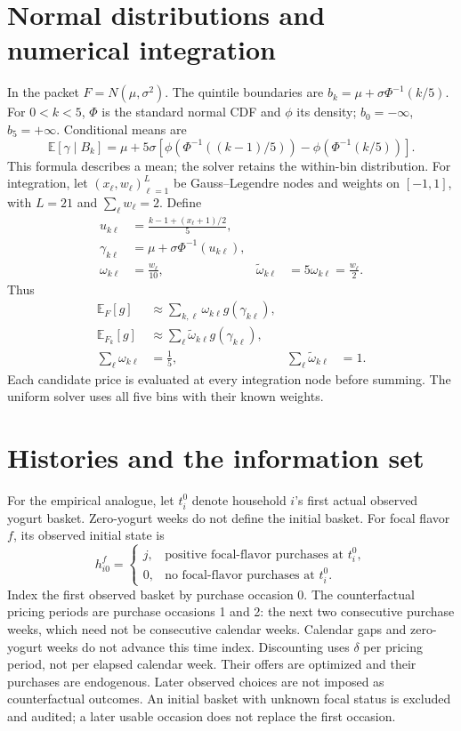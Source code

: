\documentclass[11pt]{article}
\newcommand{\E}{\mathbb{E}}
\begin{document}
\section{Normal distributions and numerical integration}
In the packet $F=N(\mu,\sigma^2)$. The quintile boundaries are
$b_k=\mu+\sigma\Phi^{-1}(k/5)$.
For $0<k<5$, $\Phi$ is the standard normal CDF and $\phi$ its density;
$b_0=-\infty$, $b_5=+\infty$. Conditional means are
\begin{equation}
 \E[\gamma\mid B_k]=\mu+5\sigma\left[
 \phi(\Phi^{-1}((k-1)/5))-\phi(\Phi^{-1}(k/5))\right].
\end{equation}
This formula describes a mean; the solver retains the within-bin distribution.
For integration, let $(x_\ell,w_\ell)_{\ell=1}^L$ be Gauss--Legendre nodes
and weights on $[-1,1]$, with $L=21$ and $\sum_\ell w_\ell=2$. Define
\begin{align}
 u_{k\ell}&=\frac{k-1+(x_\ell+1)/2}{5},\\
 \gamma_{k\ell}&=\mu+\sigma\Phi^{-1}(u_{k\ell}),\\
 \omega_{k\ell}&=\frac{w_\ell}{10},&
 \widetilde\omega_{k\ell}&=5\omega_{k\ell}=\frac{w_\ell}{2}.
\end{align}
Thus
\begin{align}
 \E_F[g]&\approx\sum_{k,\ell}\omega_{k\ell}g(\gamma_{k\ell}),\\
 \E_{F_k}[g]&\approx\sum_\ell\widetilde\omega_{k\ell}g(\gamma_{k\ell}),\\
 \sum_\ell\omega_{k\ell}&=\tfrac15,&
 \sum_\ell\widetilde\omega_{k\ell}&=1.
\end{align}
Each candidate price is evaluated at every integration node before summing.
The uniform solver uses all five bins with their known weights.

\section{Histories and the information set}
For the empirical analogue, let $t_i^0$ denote household $i$'s first actual
observed yogurt basket. Zero-yogurt weeks do not define the initial basket.
For focal flavor $f$, its observed initial state is
\begin{equation}
 h_{i0}^f=\begin{cases}j,&\text{positive focal-flavor purchases at }t_i^0,\\
 0,&\text{no focal-flavor purchases at }t_i^0.\end{cases}
\end{equation}
Index the first observed basket by purchase occasion 0. The counterfactual
pricing periods are purchase occasions 1 and 2: the next two consecutive
purchase weeks, which need not be consecutive calendar weeks. Calendar gaps
and zero-yogurt weeks do not advance this time index. Discounting uses $\delta$
per pricing period, not per elapsed calendar week.
Their offers are optimized and their purchases are endogenous. Later observed
choices are not imposed as counterfactual outcomes. An initial basket with
unknown focal status is excluded and audited; a later usable occasion does
not replace the first occasion.
\end{document}

